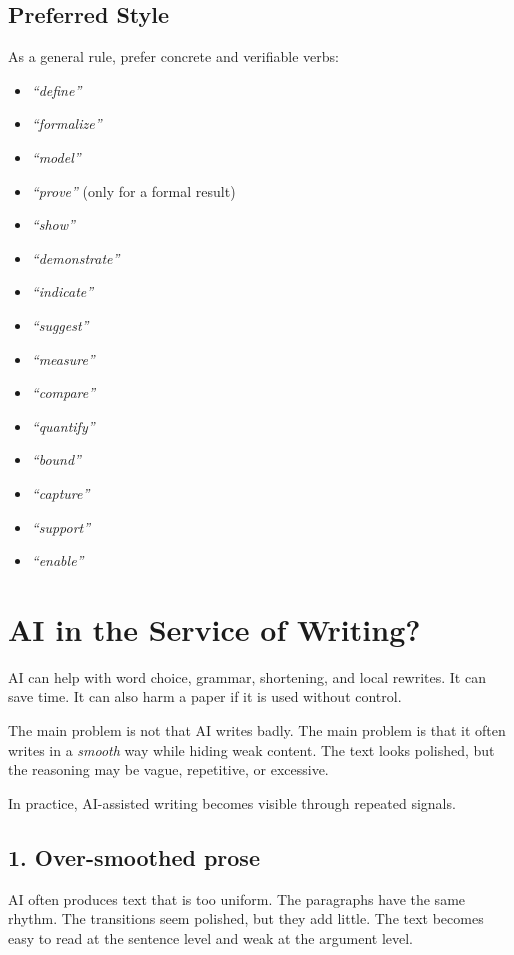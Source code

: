 \documentclass[11pt,a4paper]{article}
\theoremstyle{definition}
\begin{document}
\subsection*{Preferred Style}

As a general rule, prefer concrete and verifiable verbs:
\begin{itemize}
    \item \textit{``define''}
    \item \textit{``formalize''}
    \item \textit{``model''}
    \item \textit{``prove''} (only for a formal result)
    \item \textit{``show''}
    \item \textit{``demonstrate''}
    \item \textit{``indicate''}
    \item \textit{``suggest''}
    \item \textit{``measure''}
    \item \textit{``compare''}
    \item \textit{``quantify''}
    \item \textit{``bound''}
    \item \textit{``capture''}
    \item \textit{``support''}
    \item \textit{``enable''}
\end{itemize}

\section{AI in the Service of Writing?}

AI can help with word choice, grammar, shortening, and local rewrites. It can save time. It can also harm a paper if it is used without control.

The main problem is not that AI writes badly. The main problem is that it often writes in a \emph{smooth} way while hiding weak content. The text looks polished, but the reasoning may be vague, repetitive, or excessive.

In practice, AI-assisted writing becomes visible through repeated signals.

\subsection*{1. Over-smoothed prose}

AI often produces text that is too uniform. The paragraphs have the same rhythm.
The transitions seem polished, but they add little. The text becomes easy to read at the sentence level and weak at the argument level.
\end{document}
